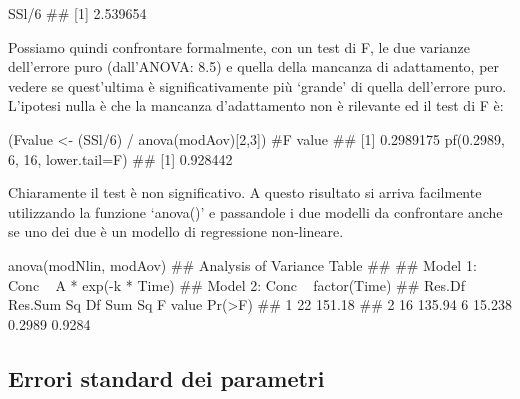 \documentclass[a4paper,12pt,oneside]{book}
\newenvironment{Shaded}{}{}
\newcommand{\KeywordTok}[1]{#1}
\newcommand{\DataTypeTok}[1]{#1}
\newcommand{\DecValTok}[1]{#1}
\newcommand{\FloatTok}[1]{#1}
\newcommand{\StringTok}[1]{#1}
\newcommand{\CommentTok}[1]{#1}
\newcommand{\OperatorTok}[1]{#1}
\newcommand{\NormalTok}[1]{#1}
\begin{document}
\begin{Shaded}
\begin{Highlighting}[]
\NormalTok{SSl}\OperatorTok{/}\DecValTok{6}
\CommentTok{## [1] 2.539654}
\end{Highlighting}
\end{Shaded}

Possiamo quindi confrontare formalmente, con un test di F, le due varianze dell'errore puro (dall'ANOVA: 8.5) e quella della mancanza di adattamento, per vedere se quest'ultima è significativamente più `grande' di quella dell'errore puro. L'ipotesi nulla è che la mancanza d'adattamento non è rilevante ed il test di F è:

\begin{Shaded}
\begin{Highlighting}[]
\NormalTok{(Fvalue <-}\StringTok{ }\NormalTok{(SSl}\OperatorTok{/}\DecValTok{6}\NormalTok{) }\OperatorTok{/}\StringTok{ }\KeywordTok{anova}\NormalTok{(modAov)[}\DecValTok{2}\NormalTok{,}\DecValTok{3}\NormalTok{]) }\CommentTok{#F value}
\CommentTok{## [1] 0.2989175}
\KeywordTok{pf}\NormalTok{(}\FloatTok{0.2989}\NormalTok{, }\DecValTok{6}\NormalTok{, }\DecValTok{16}\NormalTok{, }\DataTypeTok{lower.tail=}\NormalTok{F)}
\CommentTok{## [1] 0.928442}
\end{Highlighting}
\end{Shaded}

Chiaramente il test è non significativo. A questo risultato si arriva facilmente utilizzando la funzione `anova()' e passandole i due modelli da confrontare anche se uno dei due è un modello di regressione non-lineare.

\begin{Shaded}
\begin{Highlighting}[]
\KeywordTok{anova}\NormalTok{(modNlin, modAov)}
\CommentTok{## Analysis of Variance Table}
\CommentTok{## }
\CommentTok{## Model 1: Conc ~ A * exp(-k * Time)}
\CommentTok{## Model 2: Conc ~ factor(Time)}
\CommentTok{##   Res.Df Res.Sum Sq Df Sum Sq F value Pr(>F)}
\CommentTok{## 1     22     151.18                         }
\CommentTok{## 2     16     135.94  6 15.238  0.2989 0.9284}
\end{Highlighting}
\end{Shaded}

\hypertarget{errori-standard-dei-parametri-1}{%
\subsection{Errori standard dei parametri}\label{errori-standard-dei-parametri-1}}
\end{document}
